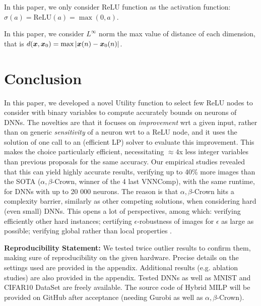 \documentclass{llncs}
\newcommand{\ReLU}{\mathrm{ReLU}}
\begin{document}
In this paper, we only consider $\ReLU$ function as the activation function: $\sigma(a)=\ReLU(a)=\max(0,a)$. 

In this paper, we consider $L^{\infty}$ norm the max value of distance of each dimension, that is $d({\bm{x}},\boldsymbol{x}_0)=\max |\boldsymbol{x}(n)-\boldsymbol{x}_0(n)|$. 
\fi



%












\section{Conclusion}
{\color{blue}
	In this paper, we developed a novel Utility function to select few ReLU nodes to consider with binary variables to compute accurately bounds on neurons of DNNs. The novelties are that it focuses on {\em improvement} wrt a given input, rather than on generic {\em sensitivity} of a neuron wrt to a ReLU node, and it uses the solution of one call to an (efficient LP) solver to evaluate this improvement. This makes the choice particularly efficient, necessitating $\approx4$x less integer variables than previous proposals \cite{DivideAndSlide} for the same accuracy.} 
Our empirical studies revealed that this can yield highly accurate results, verifying up to 40\% more images than the SOTA ($\alpha,\beta$-Crown, winner of the 4 last VNNComp), with the same runtime, for DNNs with up to 20 000 neurons. 
The reason is that $\alpha,\beta$-Crown hits a complexity barrier, similarly as other competing solutions, when considering hard (even small) DNNs. This opens a lot of perspectives, among which: verifying efficiently other hard instances; certifying $\epsilon$-robustness of images for $\epsilon$ as large as possible; 
verifying global rather than local properties \cite{lipshitz}.


{\bf Reproducibility Statement:} 
We tested twice outlier results to confirm them, making sure of reproducibility on the given hardware. Precise details on the settings used are provided in the appendix.
Additional results {\color{blue}(e.g. ablation studies)} are also provided in the appendix.
Tested DNNs as well as MNIST and CIFAR10 DataSet are freely available.
The source code of Hybrid MILP will be provided on GitHub after acceptance (needing Gurobi as well as $\alpha,\beta$-Crown).

\newpage




\bigskip

\appendix


\end{document}
